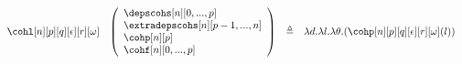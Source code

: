 \documentclass{msc}
\newcommand{\defeq}{\ensuremath{\triangleq}}
\begin{document}
\begin{equation*}
\begin{array}{llcl}
    \cohl[n][p][q][\epsilon][r][\omega]                                                       &
    \left(\begin{array}{l}
              \depscohs[n][0,...,p]        \\
              \extradepscohs[n][p-1,...,n] \\
              \cohp[n][p]                  \\
              \cohf[n][0,...,p]            \\
            \end{array}\right)                                                           & \defeq &
    \lambda d. \lambda l. \lambda \theta. (\cohp[n][p][q][\epsilon][r][\omega](l))                                                                                                           \\
  \end{array}
\end{equation*}



\end{document}
